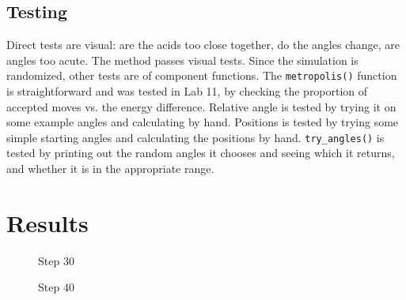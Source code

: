 \documentclass{article}
\begin{document}
	\subsection{Testing}
		Direct tests are visual: are the acids too close together, do the angles change, are angles too acute. The method passes visual tests. Since the simulation is randomized, other tests are of component functions. The \texttt{metropolis()} function is straightforward and was tested in Lab 11, by checking the proportion of accepted moves vs. the energy difference. Relative angle is tested by trying it on some example angles and calculating by hand. Positions is tested by trying some simple starting angles and calculating the positions by hand. \texttt{try\_angles()} is tested by printing out the random angles it chooses and seeing which it returns, and whether it is in the appropriate range.


\section{Results}
	\begin{figure}[h]
	  \begin{floatrow}
	    {\caption{Step 30}
	  \label{fig:step30}}
	  {\caption{Step 40}
	  \label{fig:step40}}
	  \end{floatrow}
	\end{figure}
\end{document}
